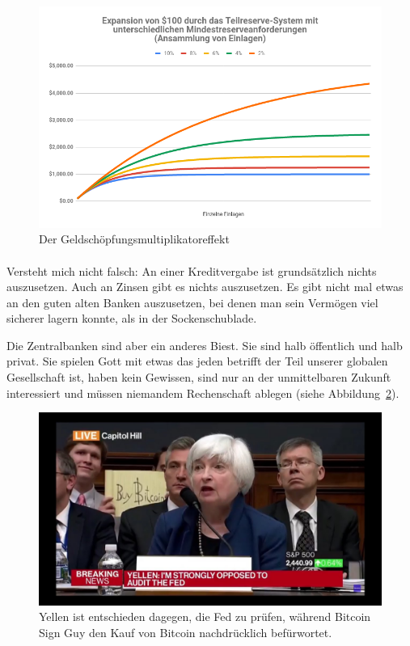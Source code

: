 \begin{figure}
  \centering
  \includegraphics{assets/images/money-multiplier-de.png}
  \caption{Der Geldschöpfungsmultiplikatoreffekt}
  \label{fig:money-multiplier}
\end{figure}

\paragraph{}
Versteht mich nicht falsch: An einer Kreditvergabe ist grundsätzlich nichts
auszusetzen. Auch an Zinsen gibt es nichts auszusetzen. Es gibt nicht mal etwas
an den guten alten Banken auszusetzen, bei denen man sein Vermögen viel sicherer
lagern konnte, als in der Sockenschublade.

Die Zentralbanken sind aber ein anderes Biest. Sie sind halb öffentlich und halb
privat. Sie spielen Gott mit etwas das jeden betrifft der Teil unserer globalen
Gesellschaft ist, haben kein Gewissen, sind nur an der unmittelbaren Zukunft
interessiert und müssen niemandem Rechenschaft ablegen (siehe
Abbildung~\ref{fig:bsg}).

\begin{figure}
  \centering
  \includegraphics{assets/images/bsg.jpg}
  \caption{Yellen ist entschieden dagegen, die Fed zu prüfen, während Bitcoin
  Sign Guy den Kauf von Bitcoin nachdrücklich befürwortet.}
  \label{fig:bsg}
\end{figure}

